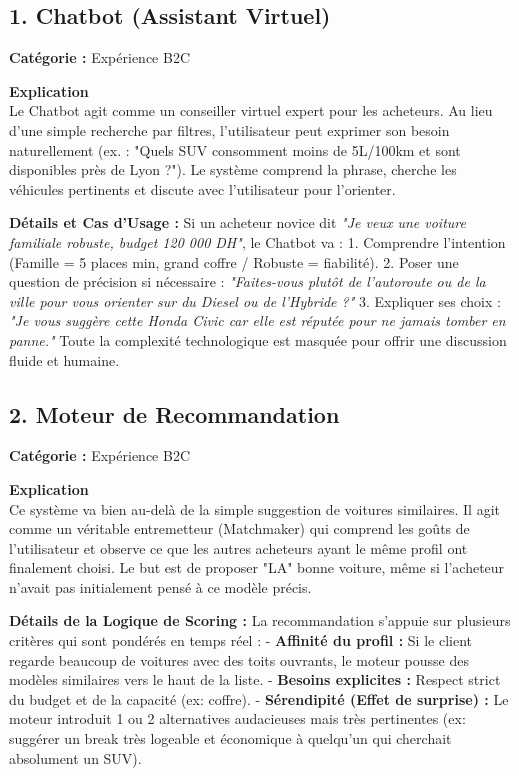 \documentclass[11pt,a4paper]{article}
\begin{document}
\subsection{1. Chatbot (Assistant Virtuel)}
\textbf{Catégorie :} Expérience B2C

\textbf{Explication}\\
Le Chatbot agit comme un conseiller virtuel expert pour les acheteurs. Au lieu d'une simple recherche par filtres, l'utilisateur peut exprimer son besoin naturellement (ex. : "Quels SUV consomment moins de 5L/100km et sont disponibles près de Lyon ?"). Le système comprend la phrase, cherche les véhicules pertinents et discute avec l'utilisateur pour l'orienter. 

\textbf{Détails et Cas d'Usage :} 
Si un acheteur novice dit \textit{"Je veux une voiture familiale robuste, budget 120 000 DH"}, le Chatbot va :
1. Comprendre l'intention (Famille = 5 places min, grand coffre / Robuste = fiabilité).
2. Poser une question de précision si nécessaire : \textit{"Faites-vous plutôt de l'autoroute ou de la ville pour vous orienter sur du Diesel ou de l'Hybride ?"}
3. Expliquer ses choix : \textit{"Je vous suggère cette Honda Civic car elle est réputée pour ne jamais tomber en panne."}
Toute la complexité technologique est masquée pour offrir une discussion fluide et humaine.

\subsection{2. Moteur de Recommandation}
\textbf{Catégorie :} Expérience B2C

\textbf{Explication}\\
Ce système va bien au-delà de la simple suggestion de voitures similaires. Il agit comme un véritable entremetteur (Matchmaker) qui comprend les goûts de l'utilisateur et observe ce que les autres acheteurs ayant le même profil ont finalement choisi. Le but est de proposer "LA" bonne voiture, même si l'acheteur n'avait pas initialement pensé à ce modèle précis.

\textbf{Détails de la Logique de Scoring :}
La recommandation s'appuie sur plusieurs critères qui sont pondérés en temps réel :
- \textbf{Affinité du profil :} Si le client regarde beaucoup de voitures avec des toits ouvrants, le moteur pousse des modèles similaires vers le haut de la liste.
- \textbf{Besoins explicites :} Respect strict du budget et de la capacité (ex: coffre).
- \textbf{Sérendipité (Effet de surprise) :} Le moteur introduit 1 ou 2 alternatives audacieuses mais très pertinentes (ex: suggérer un break très logeable et économique à quelqu'un qui cherchait absolument un SUV).
\end{document}
